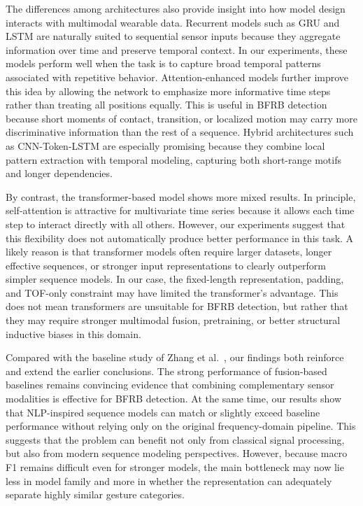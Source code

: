 \documentclass[conference]{IEEEtran}
\begin{document}
The differences among architectures also provide insight into how model design interacts with multimodal wearable data. Recurrent models such as GRU and LSTM are naturally suited to sequential sensor inputs because they aggregate information over time and preserve temporal context. In our experiments, these models perform well when the task is to capture broad temporal patterns associated with repetitive behavior. Attention-enhanced models further improve this idea by allowing the network to emphasize more informative time steps rather than treating all positions equally. This is useful in BFRB detection because short moments of contact, transition, or localized motion may carry more discriminative information than the rest of a sequence. Hybrid architectures such as CNN-Token-LSTM are especially promising because they combine local pattern extraction with temporal modeling, capturing both short-range motifs and longer dependencies.

By contrast, the transformer-based model shows more mixed results. In principle, self-attention is attractive for multivariate time series because it allows each time step to interact directly with all others. However, our experiments suggest that this flexibility does not automatically produce better performance in this task. A likely reason is that transformer models often require larger datasets, longer effective sequences, or stronger input representations to clearly outperform simpler sequence models. In our case, the fixed-length representation, padding, and TOF-only constraint may have limited the transformer's advantage. This does not mean transformers are unsuitable for BFRB detection, but rather that they may require stronger multimodal fusion, pretraining, or better structural inductive biases in this domain.

Compared with the baseline study of Zhang et al.~\cite{zhang2025bfrb}, our findings both reinforce and extend the earlier conclusions. The strong performance of fusion-based baselines remains convincing evidence that combining complementary sensor modalities is effective for BFRB detection. At the same time, our results show that NLP-inspired sequence models can match or slightly exceed baseline performance without relying only on the original frequency-domain pipeline. This suggests that the problem can benefit not only from classical signal processing, but also from modern sequence modeling perspectives. However, because macro F1 remains difficult even for stronger models, the main bottleneck may now lie less in model family and more in whether the representation can adequately separate highly similar gesture categories.
\end{document}

